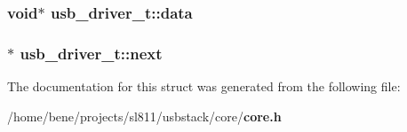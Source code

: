 \subsubsection{\setlength{\rightskip}{0pt plus 5cm}void$\ast$ {\bf usb\_\-driver\_\-t::data}}\label{structusb__driver__t_87bc1db73db9237172804012b55d72a1}


\subsubsection{$\ast$ {\bf usb\_\-driver\_\-t::next}}\label{structusb__driver__t_f7c6ecc6b5a081e1bab8f56a23c1380b}




The documentation for this struct was generated from the following file:\begin{CompactItemize}
\item 
/home/bene/projects/sl811/usbstack/core/{\bf core.h}\end{CompactItemize}
